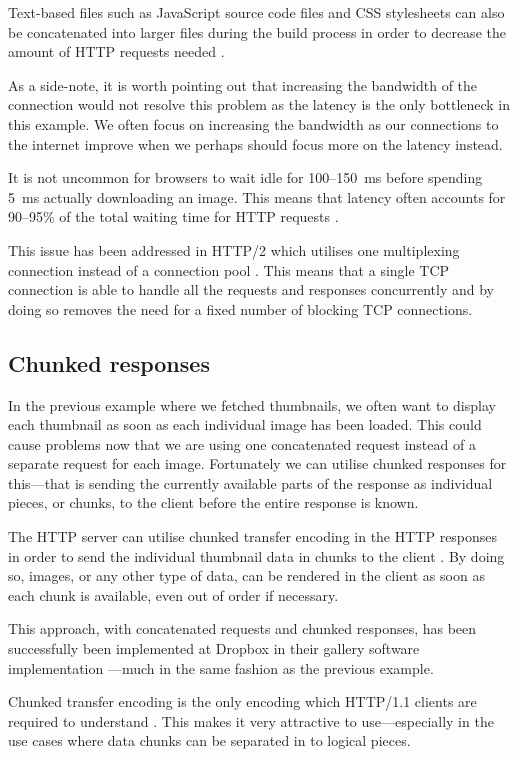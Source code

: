 \documentclass{cslthse-msc}
\begin{document}
Text-based files such as JavaScript source code files and CSS stylesheets can also be concatenated into larger files during the build process in order to decrease the amount of HTTP requests needed \cite{js_concat}.

As a side-note, it is worth pointing out that increasing the bandwidth of the connection would not resolve this problem as the latency is the only bottleneck in this example. We often focus on increasing the bandwidth as our connections to the internet improve when we perhaps should focus more on the latency instead.

It is not uncommon for browsers to wait idle for 100--150~ms before spending 5~ms actually downloading an image. This means that latency often accounts for 90--95\% of the total waiting time for HTTP requests \cite{latency}.

This issue has been addressed in HTTP/2 which utilises one multiplexing connection instead of a connection pool \cite{rfc_7540}. This means that a single TCP connection is able to handle all the requests and responses concurrently and by doing so removes the need for a fixed number of blocking TCP connections.

\subsection{Chunked responses}
In the previous example where we fetched thumbnails, we often want to display each thumbnail as soon as each individual image has been loaded. This could cause problems now that we are using one concatenated request instead of a separate request for each image. Fortunately we can utilise chunked responses for this---that is sending the currently available parts of the response as individual pieces, or chunks, to the client before the entire response is known.

The HTTP server can utilise chunked transfer encoding in the HTTP responses in order to send the individual thumbnail data in chunks to the client \cite{chunked}. By doing so, images, or any other type of data, can be rendered in the client as soon as each chunk is available, even out of order if necessary. 

This approach, with concatenated requests and chunked responses, has been successfully been implemented at Dropbox in their gallery software implementation \cite{dropbox_chunked}---much in the same fashion as the previous example.

Chunked transfer encoding is the only encoding which HTTP/1.1 clients are required to understand \cite{chunked_required}. This makes it very attractive to use---especially in the use cases where data chunks can be separated in to logical pieces.
\end{document}
